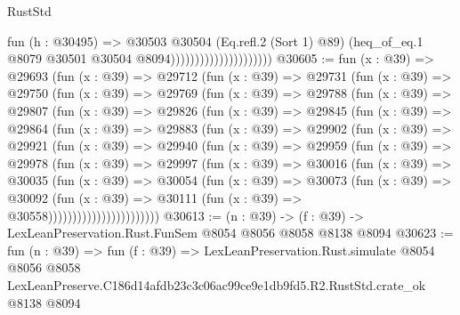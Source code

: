 \begin{lexlean}{RustStd}
\begin{coremodule}
                                          fun (h : @30495) =>
                                          @30503
                                            @30504
                                            (Eq.refl.{2} (Sort 1) @89)
                                            (heq_of_eq.{1}
                                              @8079
                                              @30501
                                              @30504
                                              @8094)))))))))))))))))))))
@30605 := fun (x : @39) =>
  @29693
    (fun (x : @39) =>
    @29712
      (fun (x : @39) =>
      @29731
        (fun (x : @39) =>
        @29750
          (fun (x : @39) =>
          @29769
            (fun (x : @39) =>
            @29788
              (fun (x : @39) =>
              @29807
                (fun (x : @39) =>
                @29826
                  (fun (x : @39) =>
                  @29845
                    (fun (x : @39) =>
                    @29864
                      (fun (x : @39) =>
                      @29883
                        (fun (x : @39) =>
                        @29902
                          (fun (x : @39) =>
                          @29921
                            (fun (x : @39) =>
                            @29940
                              (fun (x : @39) =>
                              @29959
                                (fun (x : @39) =>
                                @29978
                                  (fun (x : @39) =>
                                  @29997
                                    (fun (x : @39) =>
                                    @30016
                                      (fun (x : @39) =>
                                      @30035
                                        (fun (x : @39) =>
                                        @30054
                                          (fun (x : @39) =>
                                          @30073
                                            (fun (x : @39) =>
                                            @30092
                                              (fun (x : @39) =>
                                              @30111 (fun (x : @39) => @30558)))))))))))))))))))))))
@30613 := (n : @39) -> (f : @39) -> LexLeanPreservation.Rust.FunSem @8054 @8056 @8058 @8138 @8094
@30623 := fun (n : @39) =>
  fun (f : @39) =>
  LexLeanPreservation.Rust.simulate
    @8054
    @8056
    @8058
    LexLeanPreserve.C186d14afdb23c3c06ac99ce9e1db9fd5.R2.RustStd.crate_ok
    @8138
    @8094
\end{coremodule}
\end{lexlean}
